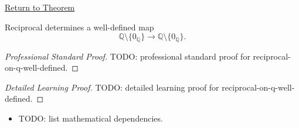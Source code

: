 \newpage
{}
\label{prf:reciprocal-on-q-well-defined}

\begin{remark*}[Return]
\hyperref[thm:reciprocal-on-q-well-defined]{Return to Theorem}
\end{remark*}

\begin{theorem*}
Reciprocal determines a well-defined map
\[
\mathbb{Q}\setminus\{0_{\mathbb{Q}}\}\to\mathbb{Q}\setminus\{0_{\mathbb{Q}}\}.
\]
\end{theorem*}

\begin{proof}[Professional Standard Proof]
\LRAProofBodyStart
TODO: professional standard proof for reciprocal-on-q-well-defined.
\end{proof}

\begin{proof}[Detailed Learning Proof]
\LRAProofBodyStart
TODO: detailed learning proof for reciprocal-on-q-well-defined.
\end{proof}

\begin{remark*}
\end{remark*}

\begin{dependencies}
\begin{itemize}
  \item TODO: list mathematical dependencies.
\end{itemize}
\end{dependencies}

\clearpage
